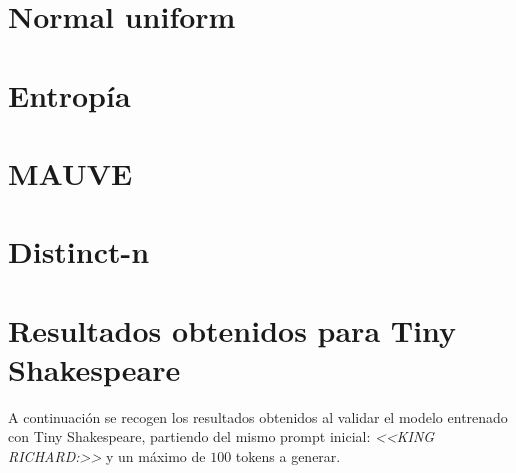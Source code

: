 \documentclass[11pt]{book}
\begin{document}
\section{Normal uniform} \label{sec:normal}

\section{Entropía} \label{sec:entropia}

\section{MAUVE} \label{sec:mauve}


\section{Distinct-n} \label{sec:distinct-n}

\section{Resultados obtenidos para Tiny Shakespeare} \label{sec:res-tiny}

A continuación se recogen los resultados obtenidos al validar el modelo entrenado con Tiny Shakespeare, partiendo del mismo prompt inicial: \textit{<<KING RICHARD:>>} y un máximo de $100$ tokens a generar.
\end{document}
